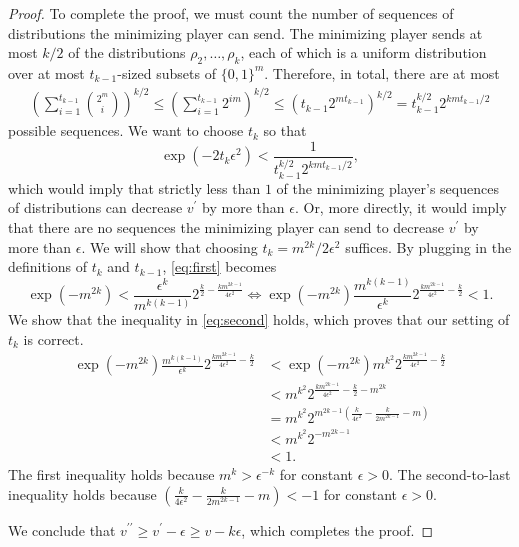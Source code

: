 \documentclass[11pt]{article}
\newcommand{\eps}{\epsilon}
\theoremstyle{definition}
\begin{document}
\begin{proof}
    To complete the proof, we must count the number of sequences of distributions the minimizing player can send. 
    The minimizing player sends at most $k/2$ of the distributions $\rho_2, \ldots, \rho_k$, each of which is a uniform distribution over at most $t_{k-1}$-sized subsets of $\{0,1\}^m$. 
    Therefore, in total, there are at most
    \begin{gather*}
        \left(\sum_{i=1}^{t_{k-1}} \binom{2^m}{i} \right)^{k/2} \leq \left(\sum_{i=1}^{t_{k-1}} 2^{im} \right)^{k/2} \leq \left(t_{k-1} 2^{mt_{k-1}}\right)^{k/2} = t^{k/2}_{k-1} 2^{kmt_{k-1}/2}
    \end{gather*}
    possible sequences.
    We want to choose $t_k$ so that 
    \begin{equation}\label{eq:first}
    \exp\left(-2 t_k \eps^2\right) < \frac{1}{t^{k/2}_{k-1} 2^{kmt_{k-1}/2}},
    \end{equation}
    which would imply that strictly less than $1$ of the minimizing player's sequences of distributions can decrease $v^\prime$ by more than $\eps$. 
    Or, more directly, it would imply that there are no sequences the minimizing player can send to decrease $v^\prime$ by more than $\eps$. 
    We will show that choosing $t_k = m^{2k}/2\eps^2$ suffices. 
    By plugging in the definitions of $t_k$ and $t_{k-1}$, \cref{eq:first} becomes 
    \begin{equation}\label{eq:second}
    \exp\left(-m^{2k}\right) < \frac{\eps^k}{ m^{k(k-1)}} 2^{\frac{k}{2}-\frac{km^{2k -1}}{4 \eps^2}} \iff 
    \exp\left(-m^{2k}\right)  \frac{ m^{k(k-1)}}{\eps^k} 2^{\frac{km^{2k -1}}{4 \eps^2}-\frac{k}{2}} < 1. 
    \end{equation}
    We show that the inequality in \cref{eq:second} holds, which proves that our setting of $t_k$ is correct. 
    \begin{align*}
    \exp\left(-m^{2k}\right)  \frac{ m^{k(k-1)}}{\eps^k} 2^{\frac{km^{2k -1}}{4 \eps^2}-\frac{k}{2}} 
    &< \exp\left(-m^{2k}\right) m^{k^2} 2^{\frac{km^{2k -1}}{4 \eps^2}-\frac{k}{2}}  \\
    &< m^{k^2} 2^{\frac{km^{2k -1}}{4 \eps^2}-\frac{k}{2} - m^{2k}}  \\
    &= m^{k^2} 2^{m^{2k -1}\left(\frac{k}{4 \eps^2}-\frac{k}{2m^{2k-1}} - m\right)}  \\
    &< m^{k^2} 2^{-m^{2k -1}}  \\
    &< 1. 
    \end{align*}
    The first inequality holds because $m^{k} > \eps^{-k}$ for constant $\eps > 0$. The second-to-last inequality holds because $\left(\frac{k}{4 \eps^2}-\frac{k}{2m^{2k-1}} - m\right) < -1$ for constant $\eps > 0$.

   We conclude that $v^{\prime \prime} \geq v^\prime - \eps \geq v - k\eps$, which completes the proof. 
\end{proof}
\end{document}
